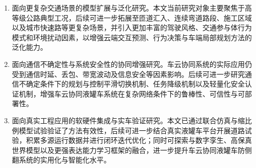 \begin{enumerate}[itemsep=2pt, parsep=0pt]
    \item 面向更复杂交通场景的模型扩展与泛化研究。本文当前研究对象主要聚焦于高等级公路典型工况，后续可进一步拓展至匝道汇入、连续弯道路段、施工区域以及城市快速路等更复杂场景，并引入更加丰富的驾驶风格、交通参与体行为模式和环境扰动因素，以增强云端交互预测、行为决策与车端局部规划方法的泛化能力。
    
    \item 面向通信不确定性与系统安全性的协同增强研究。车云协同系统的实际应用仍受到通信时延、丢包、带宽波动及信息安全等因素影响。后续可进一步研究通信不确定条件下的规划与控制平滑切换机制、任务降级机制以及轻量化安全认证机制，增强车云协同液罐车系统在复杂网络条件下的鲁棒性、可信性与可部署性。
    
    \item 面向真实工程应用的软硬件集成与实车验证研究。本文已通过联合仿真与缩比例模型试验验证了方法有效性，后续可进一步结合真实液罐车平台开展道路试验，积累多源运行数据并进行闭环迭代优化；同时可探索与数字孪生、高保真世界模型以及更强表达能力学习框架的融合，进一步提升车云协同液罐车防侧翻系统的实用化与智能化水平。
\end{enumerate}
